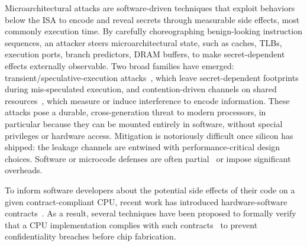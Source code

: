 
Microarchitectural attacks are software-driven techniques that exploit behaviors below the ISA to encode and reveal secrets through measurable side effects, most commonly execution time.
By carefully choreographing benign-looking instruction sequences, an attacker steers microarchitectural state, such as caches, TLBs, execution ports, branch predictors, DRAM buffers, to make secret-dependent effects externally observable.
Two broad families have emerged: transient/speculative-execution attacks~\cite{kocher2019spectre,lipp2018meltdown,armsecure,bhattacharyya2019smotherspectre,van2018foreshadow,canella2019fallout,horn2018speculative,maisuradze2018ret2spec,schwarz2019zombieload,schwarz2019netspectre,stecklina2018lazyfp,van2019ridl,ragab2021crosstalk,van2020lvi,van2021cacheout,ragab2021rage,wikner2022retbleed,trujillo2023inception,wikner2023phantom,wikner2024breaking,wikner2025bpi}, which leave secret-dependent footprints during mis-speculated execution, and contention-driven channels on shared resources~\cite{bernstein2005cache,bonneau2006cache,Liu2015LLC,YaromFalkner2014FlushReload,Gras2018TLBleed,Aldaya2019PortSmash,Yarom2016CacheBleed,Moghimi2018MemJam,Gruss2016PrefetchSCA,Pessl2016DRAMA}, which measure or induce interference to encode information.
These attacks pose a durable, cross-generation threat to modern processors, in particular because they can be mounted entirely in software, without special privileges or hardware access.
Mitigation is notoriously difficult once silicon has shipped: the leakage channels are entwined with performance-critical design choices.
Software or microcode defenses are often partial~\cite{ridlad} or impose significant overheads.

To inform software developers about the potential side effects of their code on a given contract-compliant CPU, recent work has introduced hardware-software contracts~\cite{guarnieri2021hardware,oleksenko2022revizor}.
As a result, several techniques have been proposed to formally verify that a CPU implementation complies with such contracts~\cite{dinesh2024conjunct,dinesh2025h,ceesay2024mucfi,wang2023specification,tan2025contractshadowlogic,hsiao2024rtl2mmupath} to prevent confidentiality breaches before chip fabrication.

